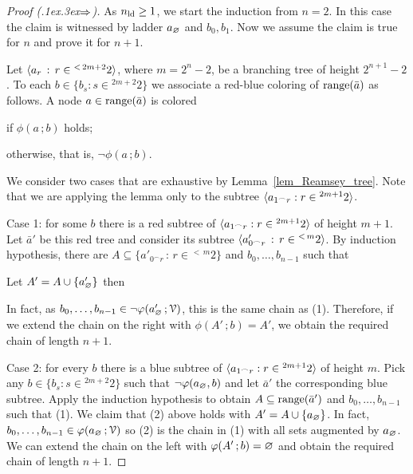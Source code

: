 \documentclass[scombinatorics.tex]{subfiles}
\begin{document}
\begin{proof}[Proof (\kern.1ex\kern.3ex\boldmath$\Rightarrow$)]
  As $n_{\rm ld}\ge 1$, we start the induction from $n=2$.
  In this case the claim is witnessed by ladder $a_\varnothing$ and $b_0,b_1$.
  Now we assume the claim is true for $n$ and prove it for $n+1$.

  Let $\langle a_r\, :\, r\in{}^{<\, 2m+2}2\rangle$, where $m=2^n-2$, be a branching tree of height $2^{n+1}-2$.
  To each $b\in\{b_s:s\in{}^{2m+2 }2\}$ we associate a red-blue coloring of $\mathop{\rm range}(\bar a)$ as follows.
  A node $a\in\mathop{\rm range}(\bar a)$ is colored
  
  \qquad\qquad {}\qquad if $\phi(a\,;b)$ holds;
  
  \qquad\qquad {}\qquad otherwise, that is, $\neg\phi(a\,;b)$.
  
  We consider two cases that are exhaustive by Lemma~\ref{lem_Reamsey_tree}.
  Note that we are applying the lemma only to the subtree $\langle a_{1^\frown r}:r\in{}^{2m+1}2\rangle$.

  Case 1: for some $b$ there is a red subtree of $\langle a_{1^\frown r}:r\in{}^{2m+1}2\rangle$ of height $m+1$.
  Let $\bar a'$ be this red tree and consider its subtree $\langle a'_{0^\frown r}\,:\,r\in {}^{<\,m}2\rangle$.
  By induction hypothesis, there are $A\subseteq\{a'_{0^\frown r}\,:\,r\in {}^{<\,m}2\}$ and $b_0,\dots,b_{n-1}$ such that


  Let $A'=A\cup\{a'_\varnothing\}$ then


  In fact, as $b_0,\dots,b_{n-1}\in\neg\varphi(a'_\varnothing\,;\EuScript V)$, this is the same chain as (1).
  Therefore, if we extend the chain on the right with $\phi(A'\,;b)=A'$, we obtain the required chain of length $n+1$.
  
  Case 2: for every $b$ there is a blue subtree of $\langle a_{1^\frown r}:r\in{}^{2m+1}2\rangle$ of height $m$.
  Pick any $b\in\{b_s:s\in{}^{2m+2}2\}$ such that $\neg\varphi(a_\varnothing, b)$ and let $\bar a'$ the corresponding blue subtree.
  Apply the induction hypothesis to obtain $A\subseteq\mathop{\rm range}(\bar a')$ and $b_0,\dots,b_{n-1}$ such that (1).
  We claim that (2) above holds with $A'=A\cup\{a_\varnothing\}$.
  In fact, $b_0,\dots,b_{n-1}\in\varphi(a_\varnothing\,;\EuScript V)$ so (2) is the chain in (1) with all sets augmented by $a_\varnothing$.
  We can extend the chain on the left with $\varphi(A'\,;b)=\varnothing$ and obtain the required chain of length $n+1$.
\end{proof}


\end{document}
